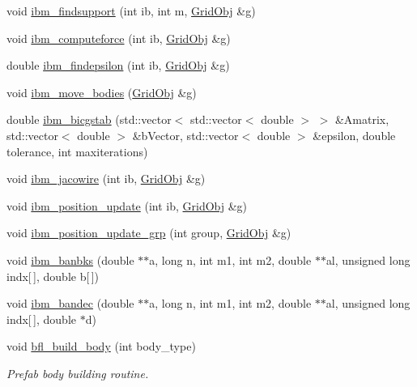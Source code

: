 \begin{DoxyCompactItemize}
void \hyperlink{class_object_manager_a51772c72562eddaf91b1eabdf74eb4c9}{ibm\+\_\+findsupport} (int ib, int m, \hyperlink{class_grid_obj}{Grid\+Obj} \&g)
\item 
void \hyperlink{class_object_manager_ab1e4ac7c9e115b8e31e7a89ec32cbee0}{ibm\+\_\+computeforce} (int ib, \hyperlink{class_grid_obj}{Grid\+Obj} \&g)
\item 
double \hyperlink{class_object_manager_ab0ef3e60b3ea723d6989c6900107d5ef}{ibm\+\_\+findepsilon} (int ib, \hyperlink{class_grid_obj}{Grid\+Obj} \&g)
\item 
void \hyperlink{class_object_manager_aef4cfcea354469472c0b25bf74757f2b}{ibm\+\_\+move\+\_\+bodies} (\hyperlink{class_grid_obj}{Grid\+Obj} \&g)
\item 
double \hyperlink{class_object_manager_adad4317bfbe5bae833c4ffa3e4538d92}{ibm\+\_\+bicgstab} (std\+::vector$<$ std\+::vector$<$ double $>$ $>$ \&Amatrix, std\+::vector$<$ double $>$ \&b\+Vector, std\+::vector$<$ double $>$ \&epsilon, double tolerance, int maxiterations)
\item 
void \hyperlink{class_object_manager_ae1d5e39f3a837adfc88c4c7ed722c895}{ibm\+\_\+jacowire} (int ib, \hyperlink{class_grid_obj}{Grid\+Obj} \&g)
\item 
void \hyperlink{class_object_manager_a07a4a328974705e440dd303c5c2e0472}{ibm\+\_\+position\+\_\+update} (int ib, \hyperlink{class_grid_obj}{Grid\+Obj} \&g)
\item 
void \hyperlink{class_object_manager_ae9a0efc0b1d088f90b3b16833f948f12}{ibm\+\_\+position\+\_\+update\+\_\+grp} (int group, \hyperlink{class_grid_obj}{Grid\+Obj} \&g)
\item 
void \hyperlink{class_object_manager_a7bf970976700f9949bb08d8dc7f8e637}{ibm\+\_\+banbks} (double $\ast$$\ast$a, long n, int m1, int m2, double $\ast$$\ast$al, unsigned long indx\mbox{[}$\,$\mbox{]}, double b\mbox{[}$\,$\mbox{]})
\item 
void \hyperlink{class_object_manager_a77eb5ec758b5956e0a609fa1fba2f8e8}{ibm\+\_\+bandec} (double $\ast$$\ast$a, long n, int m1, int m2, double $\ast$$\ast$al, unsigned long indx\mbox{[}$\,$\mbox{]}, double $\ast$d)
\item 
void \hyperlink{class_object_manager_a099a446ac7f045d11d6be6babd0a31ab}{bfl\+\_\+build\+\_\+body} (int body\+\_\+type)
\begin{DoxyCompactList}\small\item\em Prefab body building routine. \end{DoxyCompactList}\item 

\end{DoxyCompactItemize}
